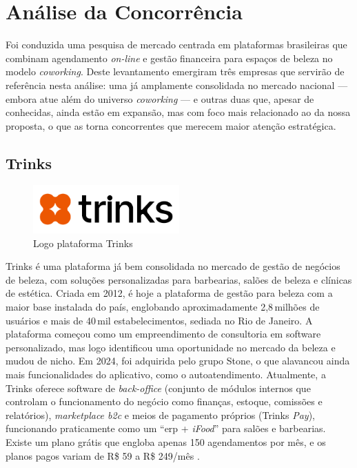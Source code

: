 \section{Análise da Concorrência}
\label{sec:analise-concorrencia}
Foi conduzida uma pesquisa de mercado centrada em plataformas brasileiras que combinam agendamento \emph{on-line} e gestão financeira para espaços de beleza no modelo \emph{coworking}. Deste levantamento emergiram três empresas que servirão de referência nesta análise: uma já amplamente consolidada no mercado nacional — embora atue além do universo \emph{coworking} — e outras duas que, apesar de conhecidas, ainda estão em expansão, mas com foco mais relacionado ao da nossa proposta, o que as torna concorrentes que merecem maior atenção estratégica.

\subsection{Trinks}

\begin{figure}[htb]
	\centering
	\includegraphics[width=0.5\textwidth]{cap01-Introducao/Images/1.4.1_Trinks}
	\caption{Logo plataforma Trinks}
	\label{fig:Trinks}
\end{figure}

 \FloatBarrier

Trinks é uma plataforma já bem consolidada no mercado de gestão de negócios de beleza, com soluções
personalizadas para barbearias, salões de beleza e clínicas de estética. Criada em 2012, é hoje a
plataforma de gestão para beleza com a maior base instalada do país, englobando aproximadamente
2,8\,milhões de usuários e mais de 40\,mil estabelecimentos, sediada no Rio de Janeiro. A plataforma começou como um empreendimento de consultoria em software personalizado, mas logo identificou uma oportunidade no mercado da beleza e mudou de nicho. Em 2024, foi adquirida pelo grupo Stone, o que alavancou ainda mais funcionalidades do aplicativo, como o autoatendimento.
Atualmente, a Trinks oferece software de \emph{back-office} (conjunto de módulos internos que controlam o funcionamento do negócio como finanças, estoque, comissões e relatórios), \emph{marketplace \gls{b2c}} e meios de pagamento próprios (Trinks \emph{Pay}), funcionando praticamente como um “\gls{erp} + \emph{iFood}” para salões e barbearias. Existe um
plano grátis que engloba apenas 150 agendamentos por mês, e os planos pagos variam de R\$ 59 a R\$ 249/mês \cite{Trinks}.

